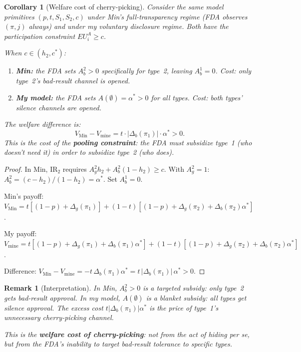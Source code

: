 \documentclass[12pt,a4paper]{article}
\newtheorem{remark}{Remark}
\newtheorem{corollary}{Corollary}
\begin{document}
\begin{corollary}[Welfare cost of cherry-picking]
\label{cor:welfare}
Consider the same model primitives
$(p, t, S_1, S_2, c)$ under Min's full-transparency regime
(FDA observes $(\pi, j)$ always) and under my voluntary
disclosure regime. Both have the participation constraint
$EU^A_i \geq c$.

When $c \in (h_2, c^*)$:
\begin{enumerate}
  \item[(i)] \textbf{Min:} the FDA sets $A_b^2 > 0$
    specifically for type~2, leaving $A_b^1 = 0$. Cost:
    only type~2's bad-result channel is opened.
  \item[(ii)] \textbf{My model:} the FDA sets
    $A(\emptyset) = \alpha^* > 0$ for all types. Cost:
    both types' silence channels are opened.
\end{enumerate}
The welfare difference is:
\begin{equation}\label{eq:welfare_cost}
  V_{\text{Min}} - V_{\text{mine}}
  = t \cdot |\Delta_b(\pi_1)| \cdot \alpha^* > 0.
\end{equation}
This is the cost of the \textbf{pooling constraint}:
the FDA must subsidize type~1 (who doesn't need it)
in order to subsidize type~2 (who does).
\end{corollary}

\begin{proof}
In Min, $\mathrm{IR}_2$ requires
$A_g^2 h_2 + A_b^2 (1-h_2) \geq c$. With $A_g^2 = 1$:
$A_b^2 = (c - h_2)/(1-h_2) = \alpha^*$. Set $A_b^1 = 0$.

Min's payoff:
$V_{\text{Min}} = t[(1-p) + \Delta_g(\pi_1)]
+ (1-t)[(1-p) + \Delta_g(\pi_2) + \Delta_b(\pi_2) \alpha^*]$.

My payoff:
$V_{\text{mine}} = t[(1-p) + \Delta_g(\pi_1)
+ \Delta_b(\pi_1) \alpha^*]
+ (1-t)[(1-p) + \Delta_g(\pi_2) + \Delta_b(\pi_2) \alpha^*]$.

Difference: $V_{\text{Min}} - V_{\text{mine}}
= -t \, \Delta_b(\pi_1) \alpha^*
= t \, |\Delta_b(\pi_1)| \, \alpha^* > 0$.
\end{proof}

\begin{remark}[Interpretation]
In Min, $A_b^2 > 0$ is a targeted subsidy: only type~2
gets bad-result approval. In my model, $A(\emptyset)$ is a
blanket subsidy: all types get silence approval. The excess
cost $t |\Delta_b(\pi_1)| \alpha^*$ is the price of
type~1's unnecessary cherry-picking channel.

This is the \textbf{welfare cost of cherry-picking}: not
from the act of hiding per se, but from the FDA's inability
to target bad-result tolerance to specific types.
\end{remark}
\end{document}
